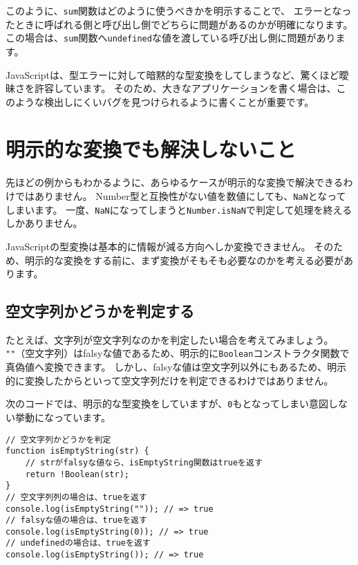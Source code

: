 このように、\texttt{sum}関数はどのように使うべきかを明示することで、
エラーとなったときに呼ばれる側と呼び出し側でどちらに問題があるのかが明確になります。
この場合は、\texttt{sum}関数へ\texttt{undefined}な値を渡している呼び出し側に問題があります。

JavaScriptは、型エラーに対して暗黙的な型変換をしてしまうなど、驚くほど曖昧さを許容しています。
そのため、大きなアプリケーションを書く場合は、このような検出しにくいバグを見つけられるように書くことが重要です。

\hypertarget{unsolved-problem}{%
\section{明示的な変換でも解決しないこと}\label{unsolved-problem}}

先ほどの例からもわかるように、あらゆるケースが明示的な変換で解決できるわけではありません。
Number型と互換性がない値を数値にしても、\texttt{NaN}となってしまいます。
一度、\texttt{NaN}になってしまうと\texttt{Number.isNaN}で判定して処理を終えるしかありません。

JavaScriptの型変換は基本的に情報が減る方向へしか変換できません。
そのため、明示的な変換をする前に、まず変換がそもそも必要なのかを考える必要があります。

\hypertarget{judge-empty-string}{%
\subsection{空文字列かどうかを判定する}\label{judge-empty-string}}

たとえば、文字列が空文字列なのかを判定したい場合を考えてみましょう。
\texttt{""}（空文字列）はfalsyな値であるため、明示的に\texttt{Boolean}コンストラクタ関数で真偽値へ変換できます。
しかし、falsyな値は空文字列以外にもあるため、明示的に変換したからといって空文字列だけを判定できるわけではありません。

次のコードでは、明示的な型変換をしていますが、\texttt{0}も\textbf{}となってしまい意図しない挙動になっています。

\begin{lstlisting}
// 空文字列かどうかを判定
function isEmptyString(str) {
    // strがfalsyな値なら、isEmptyString関数はtrueを返す
    return !Boolean(str);
}
// 空文字列列の場合は、trueを返す
console.log(isEmptyString("")); // => true
// falsyな値の場合は、trueを返す
console.log(isEmptyString(0)); // => true
// undefinedの場合は、trueを返す
console.log(isEmptyString()); // => true
\end{lstlisting}

